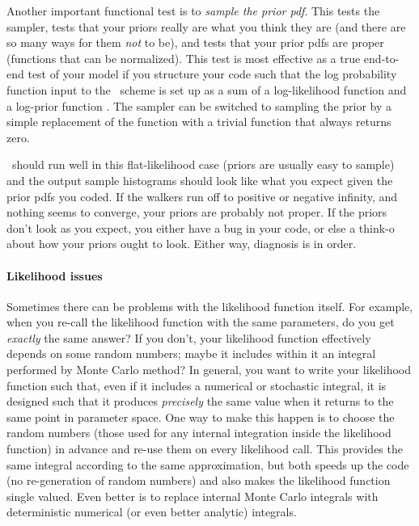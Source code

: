\documentclass[modern]{aastex61}
\newcommand{\MCMC}{\acronym{MCMC}}
\begin{document}
Another important functional test is to \emph{sample the prior pdf}.
This tests the sampler,
  tests that your priors really are what you think they are
  (and there are so many ways for them \emph{not} to be), and tests that
  your prior pdfs are proper (functions that can be normalized).
This test is most effective as a true end-to-end test of your model
  if you structure your code such that the log probability function 
  input to the \MCMC\ scheme
  is set up as a sum of a log-likelihood function 
  and a log-prior function .
The sampler can be switched to sampling the prior by a simple replacement
  of the  function
  with a trivial function that always returns zero.

\MCMC\ should run well in this flat-likelihood case (priors are usually easy to sample)
  and the output sample histograms should look like what you expect
  given the prior pdfs you coded.
If the walkers run off to positive or negative infinity,
  and nothing seems to converge,
  your priors are probably not proper.
If the priors don't look as you expect,
  you either have a bug in your code,
  or else a think-o about how your priors ought to look.
Either way, diagnosis is in order.

\paragraph{Likelihood issues}
Sometimes there can be problems with the likelihood function itself.
For example,
  when you re-call the likelihood function with the same parameters,
  do you get \emph{exactly} the same answer?
If you don't, your likelihood function effectively depends on some random numbers;
  maybe it includes within it an integral performed by Monte Carlo method?
In general, you want to write your likelihood function such that,
  even if it includes a numerical or stochastic integral,
  it is designed such that it produces \emph{precisely} the same
  value when it returns to the same point in parameter space.
One way to make this happen is to choose the random numbers
  (those used for any internal integration inside the likelihood function)
  in advance and re-use them on every likelihood call.
This provides the same integral according to the same approximation,
  but both speeds up the code (no re-generation of random numbers)
  and also makes the likelihood function single valued.
Even better is to replace internal Monte Carlo integrals with
  deterministic numerical (or even better analytic) integrals.
\end{document}
